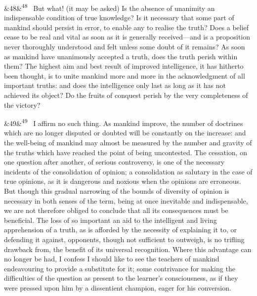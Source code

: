 \documentclass[12pt]{article}
\newcommand{\para}[1][]{\par\noindent\ifx&#1&\else\textsuperscript{\footnotesize #1}~\fi}
\begin{document}
\para[48] But what! (it may be asked) Is the absence of unanimity an indispensable condition of true knowledge? Is it necessary that some part of mankind should persist in error, to enable any to realise the truth? Does a belief cease to be real and vital as soon as it is generally received---and is a proposition never thoroughly understood and felt unless some doubt of it remains? As soon as mankind have unanimously accepted a truth, does the truth perish within them? The highest aim and best result of improved intelligence, it has hitherto been thought, is to unite mankind more and more in the acknowledgment of all important truths: and does the intelligence only last as long as it has not achieved its object? Do the fruits of conquest perish by the very completeness of the victory?

\para[49] I affirm no such thing. As mankind improve, the number of doctrines which are no longer disputed or doubted will be constantly on the increase: and the well-being of mankind may almost be measured by the number and gravity of the truths which have reached the point of being uncontested. The cessation, on one question after another, of serious controversy, is one of the necessary incidents of the consolidation of opinion; a consolidation as salutary in the case of true opinions, as it is dangerous and noxious when the opinions are erroneous. But though this gradual narrowing of the bounds of diversity of opinion is necessary in both senses of the term, being at once inevitable and indispensable, we are not therefore obliged to conclude that all its consequences must be beneficial. The loss of so important an aid to the intelligent and living apprehension of a truth, as is afforded by the necessity of explaining it to, or defending it against, opponents, though not sufficient to outweigh, is no trifling drawback from, the benefit of its universal recognition. Where this advantage can no longer be had, I confess I should like to see the teachers of mankind endeavouring to provide a substitute for it; some contrivance for making the difficulties of the question as present to the learner's consciousness, as if they were pressed upon him by a dissentient champion, eager for his conversion.
\end{document}
